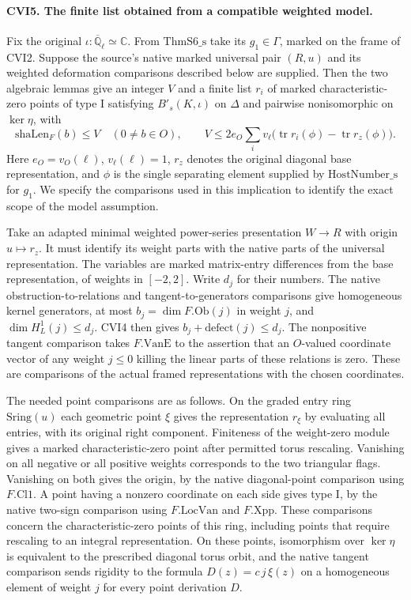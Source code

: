 \paragraph{CVI5. The finite list obtained from a compatible weighted model.}
\label{claim:CVI5}
Fix the original $\iota:\overline{\mathbb Q}_\ell\simeq\mathbb C$.
From $\mathrm{ThmS6\_s}$ take its $g_1\in\Gamma$, marked on
the frame of CVI2. Suppose the source's native marked universal
pair $(R,u)$ and its weighted deformation comparisons described below
are supplied. Then the two algebraic lemmas give an integer $V$ and
a finite list $r_i$ of marked characteristic-zero points of type I
satisfying $B'_s(K,\iota)$ on $\Delta$ and pairwise nonisomorphic
on $\ker\eta$, with
\[
  \mathrm{shaLen}_F(b)\le V\quad(0\ne b\in O),\qquad
  V\le2 e_O\sum_i v_\ell\bigl(
  \operatorname{tr}r_i(\phi)-\operatorname{tr}r_z(\phi)\bigr).
\]
Here $e_O=v_O(\ell)$, $v_\ell(\ell)=1$,
$r_z$ denotes the original diagonal base representation, and
$\phi$ is the single separating element supplied by
$\mathrm{HostNumber\_s}$ for $g_1$. We specify the comparisons used
in this implication to identify the exact scope of the model assumption.

Take an adapted minimal weighted power-series presentation $W\to R$
with origin $u\mapsto r_z$. It must identify its weight parts with
the native parts of the universal representation. The variables
are marked matrix-entry differences from the base representation,
of weights in $[-2,2]$. Write $d_j$ for their
numbers. The native obstruction-to-relations and tangent-to-generators
comparisons give homogeneous kernel generators, at most
$b_j=\dim F.\mathrm{Ob}(j)$ in weight $j$, and
$\dim H^1_L(j)\le d_j$. CVI4 then gives
$b_j+\mathrm{defect}(j)\le d_j$. The nonpositive tangent
comparison takes $F.\mathrm{VanE}$ to the assertion that an
$O$-valued coordinate vector of any weight $j\le0$ killing the
linear parts of these relations is zero. These are comparisons
of the actual framed representations with the chosen coordinates.

The needed point comparisons are as follows. On the graded
entry ring $\mathrm{Sring}(u)$ each geometric point $\xi$ gives
the representation $r_\xi$ by evaluating all entries, with its
original right component. Finiteness of the weight-zero module
gives a marked characteristic-zero point after permitted torus
rescaling. Vanishing on all negative or all positive weights
corresponds to the two triangular flags. Vanishing on both gives
the origin, by the native diagonal-point comparison using $F.\mathrm{Cl1}$.
A point having a nonzero coordinate on each side gives type I,
by the native two-sign comparison using $F.\mathrm{LocVan}$
and $F.\mathrm{Xpp}$. These comparisons concern the
characteristic-zero points of this ring, including points that
require rescaling to an integral representation. On these points,
isomorphism over $\ker\eta$ is equivalent to the prescribed
diagonal torus orbit, and the native tangent comparison sends
rigidity to the formula $D(z)=c\,j\,\xi(z)$ on a homogeneous
element of weight $j$ for every point derivation $D$.

